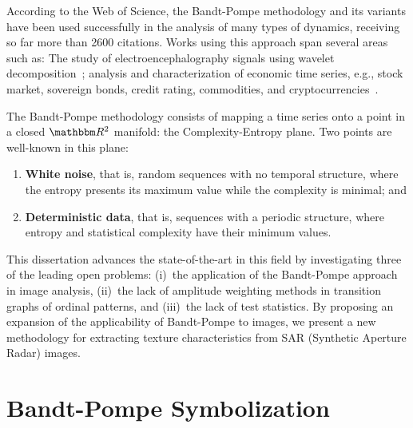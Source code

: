 \documentclass[a4,11pt]{pssbmac}
\begin{document}
According to the Web of Science, the Bandt-Pompe methodology and its variants have been used successfully in the analysis of many types of dynamics, receiving so far more than \num{2600} citations.
Works using this approach span several areas such as:
The study of electroencephalography signals using wavelet decomposition~\cite{baravalle2018discriminating};
analysis and characterization of economic time series, e.g., stock market, sovereign bonds, credit rating, commodities, and cryptocurrencies~\cite{Araujo2019permutation}.

The Bandt-Pompe methodology consists of mapping a time series onto a point in a closed $\mathbbm R^2$ manifold: the Complexity-Entropy plane.
Two points are well-known in this plane:
\begin{enumerate}
	\item \textbf{White noise}, that is, random sequences with no temporal structure, where the entropy presents its maximum value while the complexity is minimal; and
	\item \textbf{Deterministic data}, that is, sequences with a periodic structure, where entropy and statistical complexity have their minimum values.
\end{enumerate}

This dissertation advances the state-of-the-art in this field by investigating three of the leading open problems: 
(i)~the application of the Bandt-Pompe approach in image analysis,
(ii)~the lack of amplitude weighting methods in transition graphs of ordinal patterns, and 
(iii)~the lack of test statistics.
By proposing an expansion of the applicability of Bandt-Pompe to images, we present a new methodology for extracting texture characteristics from SAR (Synthetic Aperture Radar) images.

\section{Bandt-Pompe Symbolization}\label{BP}
\end{document}
